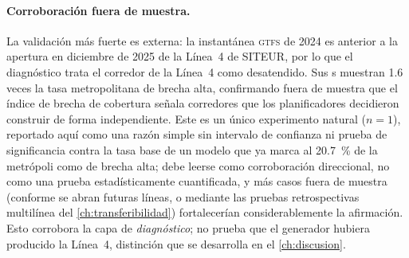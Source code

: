 \paragraph{Corroboración fuera de muestra.} La validación más fuerte es externa: la
instantánea \textsc{gtfs} de 2024 es anterior a la apertura en diciembre de 2025 de la
Línea~4 de SITEUR, por lo que el diagnóstico trata el corredor de la Línea~4 como
desatendido. Sus \ageb{}s muestran \num{1.6} veces la tasa metropolitana de brecha
alta, confirmando fuera de muestra que el índice de brecha de cobertura señala
corredores que los planificadores decidieron construir de forma independiente. Este es
un único experimento natural ($n=1$), reportado aquí como una razón simple sin intervalo
de confianza ni prueba de significancia contra la tasa base de un modelo que ya marca al
\SI{20.7}{\percent} de la metrópoli como de brecha alta; debe leerse como corroboración
direccional, no como una prueba estadísticamente cuantificada, y más casos fuera de
muestra (conforme se abran futuras líneas, o mediante las pruebas retrospectivas
multilínea del \cref{ch:transferibilidad}) fortalecerían considerablemente la
afirmación. Esto corrobora la capa de \emph{diagnóstico}; no prueba que el generador
hubiera producido la Línea~4, distinción que se desarrolla en el \cref{ch:discusion}.
